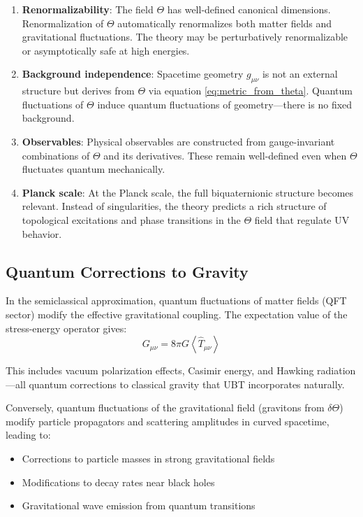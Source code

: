 \documentclass[12pt]{article}
\begin{document}
\begin{enumerate}
    \item \textbf{Renormalizability}: The field $\Theta$ has well-defined canonical dimensions. Renormalization of $\Theta$ automatically renormalizes both matter fields and gravitational fluctuations. The theory may be perturbatively renormalizable or asymptotically safe at high energies.
    
    \item \textbf{Background independence}: Spacetime geometry $g_{\mu\nu}$ is not an external structure but derives from $\Theta$ via equation \eqref{eq:metric_from_theta}. Quantum fluctuations of $\Theta$ induce quantum fluctuations of geometry—there is no fixed background.
    
    \item \textbf{Observables}: Physical observables are constructed from gauge-invariant combinations of $\Theta$ and its derivatives. These remain well-defined even when $\Theta$ fluctuates quantum mechanically.
    
    \item \textbf{Planck scale}: At the Planck scale, the full biquaternionic structure becomes relevant. Instead of singularities, the theory predicts a rich structure of topological excitations and phase transitions in the $\Theta$ field that regulate UV behavior.
\end{enumerate}

\subsection{Quantum Corrections to Gravity}

In the semiclassical approximation, quantum fluctuations of matter fields (QFT sector) modify the effective gravitational coupling. The expectation value of the stress-energy operator gives:
\begin{equation}
    G_{\mu\nu} = 8\pi G \left\langle \hat{T}_{\mu\nu} \right\rangle
\end{equation}

This includes vacuum polarization effects, Casimir energy, and Hawking radiation—all quantum corrections to classical gravity that UBT incorporates naturally.

Conversely, quantum fluctuations of the gravitational field (gravitons from $\delta\Theta$) modify particle propagators and scattering amplitudes in curved spacetime, leading to:
\begin{itemize}
    \item Corrections to particle masses in strong gravitational fields
    \item Modifications to decay rates near black holes
    \item Gravitational wave emission from quantum transitions
\end{itemize}
\end{document}
